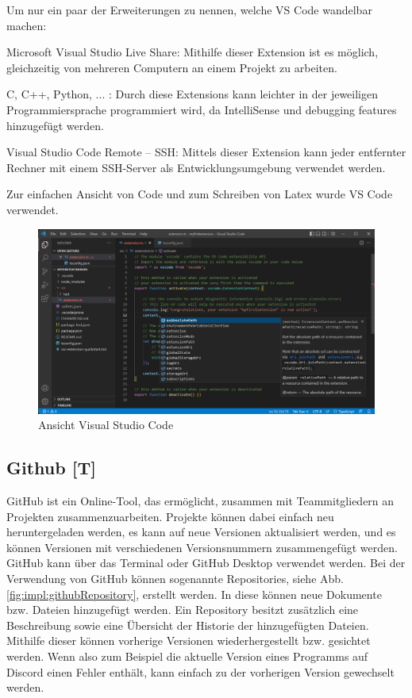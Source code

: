 Um nur ein paar der Erweiterungen zu nennen, welche VS Code wandelbar machen: 

\begin{compactitem}
    \item Microsoft Visual Studio Live Share: Mithilfe dieser Extension ist es möglich, gleichzeitig von mehreren Computern an einem Projekt zu arbeiten.
    \item C, C++, Python, ... : Durch diese Extensions kann leichter in der jeweiligen Programmiersprache programmiert wird, da IntelliSense und debugging features hinzugefügt werden.
    \item Visual Studio Code Remote – SSH: Mittels dieser Extension kann jeder entfernter Rechner mit einem SSH-Server als Entwicklungsumgebung verwendet werden.
\end{compactitem}
\cite{VSCodeOfficialSite}

Zur einfachen Ansicht von Code und zum Schreiben von Latex wurde VS Code verwendet.

\begin{figure}[h t]
  \centering
  \includegraphics[scale=0.4]{pics/visualStudioCode.png}
  \caption{Ansicht Visual Studio Code}
  \label{fig:impl:vsCode}
\end{figure}

\subsection{Github [T]} 
GitHub ist ein Online-Tool, das ermöglicht, zusammen mit Teammitgliedern  an Projekten zusammenzuarbeiten. Projekte können dabei einfach neu heruntergeladen werden, es kann auf neue Versionen aktualisiert werden, und es können Versionen mit verschiedenen Versionsnummern zusammengefügt werden. GitHub kann über das Terminal oder GitHub Desktop verwendet werden. \cite{GitHubOfficialSite}
Bei der Verwendung von GitHub können sogenannte Repositories, siehe Abb. \ref{fig:impl:githubRepository}, erstellt werden. In diese können neue Dokumente bzw. Dateien hinzugefügt werden. Ein Repository besitzt zusätzlich eine Beschreibung sowie eine Übersicht der Historie der hinzugefügten Dateien. Mithilfe dieser können vorherige Versionen wiederhergestellt bzw. gesichtet werden. Wenn also zum Beispiel die aktuelle Version eines Programms auf Discord einen Fehler enthält, kann einfach zu der vorherigen Version gewechselt werden.

